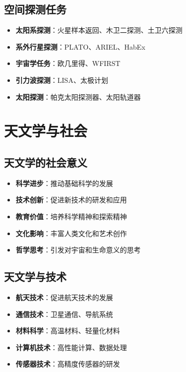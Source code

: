 \documentclass[12pt,UTF8]{ctexbook}
\begin{document}
\section{空间探测任务}

\begin{itemize}
  \item \textbf{太阳系探测}：火星样本返回、木卫二探测、土卫六探测
  \item \textbf{系外行星探测}：PLATO、ARIEL、HabEx
  \item \textbf{宇宙学任务}：欧几里得、WFIRST
  \item \textbf{引力波探测}：LISA、太极计划
  \item \textbf{太阳探测}：帕克太阳探测器、太阳轨道器
\end{itemize}

\chapter{天文学与社会}
\section{天文学的社会意义}

\begin{itemize}
  \item \textbf{科学进步}：推动基础科学的发展
  \item \textbf{技术创新}：促进新技术的研发和应用
  \item \textbf{教育价值}：培养科学精神和探索精神
  \item \textbf{文化影响}：丰富人类文化和艺术创作
  \item \textbf{哲学思考}：引发对宇宙和生命意义的思考
\end{itemize}

\section{天文学与技术}

\begin{itemize}
  \item \textbf{航天技术}：促进航天技术的发展
  \item \textbf{通信技术}：卫星通信、导航系统
  \item \textbf{材料科学}：高温材料、轻量化材料
  \item \textbf{计算机技术}：高性能计算、数据处理
  \item \textbf{传感器技术}：高精度传感器的研发
\end{itemize}
\end{document}
